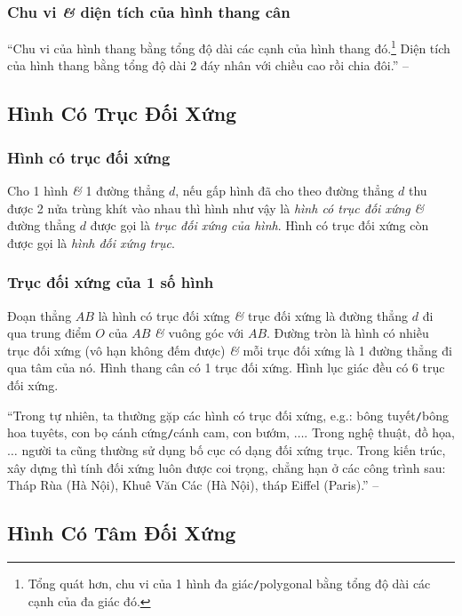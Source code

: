 \documentclass{article}
\numberwithin{equation}{section}
\begin{document}
\subsubsection{Chu vi \textit{\&} diện tích của hình thang cân}
``Chu vi của hình thang bằng tổng độ dài các cạnh của hình thang đó.\footnote{Tổng quát hơn, chu vi của 1 hình đa giác\texttt{/}polygonal bằng tổng độ dài các cạnh của đa giác đó.} Diện tích của hình thang bằng tổng độ dài 2 đáy nhân với chiều cao rồi chia đôi.'' -- \cite[p. 106]{Thai_Anh_Dat_Ha_Loan_Nam_Quang_Toan_6_tap_1}

\subsection{Hình Có Trục Đối Xứng}

\subsubsection{Hình có trục đối xứng}
Cho 1 hình \textit{\&} 1 đường thẳng $d$, nếu gấp hình đã cho theo đường thẳng $d$ thu được 2 nửa trùng khít vào nhau thì hình như vậy là \textit{hình có trục đối xứng} \textit{\&} đường thẳng $d$ được gọi là \textit{trục đối xứng của hình}. Hình có trục đối xứng còn được gọi là \textit{hình đối xứng trục}.

\subsubsection{Trục đối xứng của 1 số hình}
Đoạn thẳng $AB$ là hình có trục đối xứng \textit{\&} trục đối xứng là đường thẳng $d$ đi qua trung điểm $O$ của $AB$ \textit{\&} vuông góc với $AB$. Đường tròn là hình có nhiều trục đối xứng (vô hạn không đếm được) \textit{\&} mỗi trục đối xứng là 1 đường thẳng đi qua tâm của nó. Hình thang cân có 1 trục đối xứng. Hình lục giác đều có 6 trục đối xứng.

``Trong tự nhiên, ta thường gặp các hình có trục đối xứng, e.g.: bông tuyết\texttt{/}bông hoa tuyêts, con bọ cánh cứng\texttt{/}cánh cam, con bướm, $\ldots$. Trong nghệ thuật, đồ họa, $\ldots$ người ta cũng thường sử dụng bố cục có dạng đối xứng trục. Trong kiến trúc, xây dựng thì tính đối xứng luôn được coi trọng, chẳng hạn ở các công trình sau: Tháp Rùa (Hà Nội), Khuê Văn Các (Hà Nội), tháp Eiffel (Paris).'' -- \cite[p. 110]{Thai_Anh_Dat_Ha_Loan_Nam_Quang_Toan_6_tap_1}

\subsection{Hình Có Tâm Đối Xứng}
\end{document}
